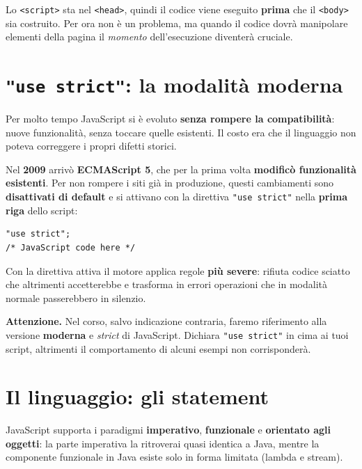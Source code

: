 \documentclass[10pt,a4paper]{article}
\newcommand{\avviso}[1]{\textbf{\textcolor{wamber}{Attenzione.}} #1}
\begin{document}
Lo \texttt{<script>} sta nel \texttt{<head>}, quindi il codice viene eseguito \textbf{prima} che il \texttt{<body>} sia costruito. Per ora non è un problema, ma quando il codice dovrà manipolare elementi della pagina il \emph{momento} dell'esecuzione diventerà cruciale.

\section{\texttt{"use strict"}: la modalità moderna}

Per molto tempo JavaScript si è evoluto \textbf{senza rompere la compatibilità}: nuove funzionalità, senza toccare quelle esistenti. Il costo era che il linguaggio non poteva correggere i propri difetti storici.

Nel \textbf{2009} arrivò \textbf{ECMAScript 5}, che per la prima volta \textbf{modificò funzionalità esistenti}. Per non rompere i siti già in produzione, questi cambiamenti sono \textbf{disattivati di default} e si attivano con la direttiva \texttt{"use strict"} nella \textbf{prima riga} dello script:

\begin{lstlisting}[style=js]
"use strict";
/* JavaScript code here */
\end{lstlisting}

Con la direttiva attiva il motore applica regole \textbf{più severe}: rifiuta codice sciatto che altrimenti accetterebbe e trasforma in errori operazioni che in modalità normale passerebbero in silenzio.

\begin{warnbox}
\avviso{Nel corso, salvo indicazione contraria, faremo riferimento alla versione \textbf{moderna} e \emph{strict} di JavaScript. Dichiara \texttt{"use strict"} in cima ai tuoi script, altrimenti il comportamento di alcuni esempi non corrisponderà.}
\end{warnbox}

\section{Il linguaggio: gli statement}

JavaScript supporta i paradigmi \textbf{imperativo}, \textbf{funzionale} e \textbf{orientato agli oggetti}: la parte imperativa la ritroverai quasi identica a Java, mentre la componente funzionale in Java esiste solo in forma limitata (lambda e stream).
\end{document}
